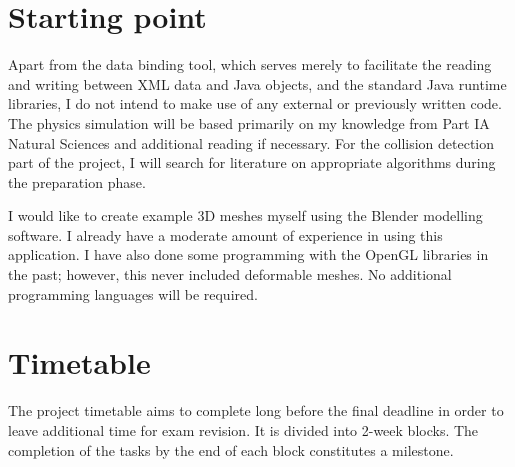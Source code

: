 \documentclass{article}
\begin{document}
\section{Starting point}

Apart from the data binding tool, which serves merely to facilitate
the reading and writing between XML data and Java objects, and the
standard Java runtime libraries, I do not intend to make use of any
external or previously written code. The physics simulation will be
based primarily on my knowledge from Part IA Natural Sciences and
additional reading if necessary. For the collision detection part
of the project, I will search for literature on appropriate algorithms
during the preparation phase.

I would like to create example 3D meshes myself using the Blender
modelling software. I already have a moderate amount of experience
in using this application. I have also done some programming with the
OpenGL libraries in the past; however, this never included deformable
meshes. No additional programming languages will be required.


\section{Timetable}

The project timetable aims to complete long before the final deadline
in order to leave additional time for exam revision. It is divided
into 2-week blocks. The completion of the tasks by the end of each
block constitutes a milestone.
\end{document}
